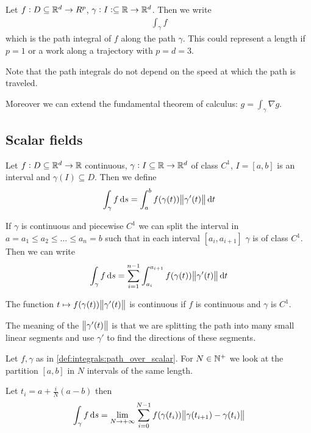 \documentclass[12pt]{extarticle}
\begin{document}
Let $f: D \subseteq \mathbb{R}^d \to R^p$, $\gamma: I:\subseteq \mathbb{R} \to \mathbb{R}^d$.
Then we write
\begin{eqnarray}
    \int_\gamma f
\end{eqnarray}
which is the path integral of $f$ along the path $\gamma$.
This could represent a length if $p = 1$ or a work along a trajectory with $p = d = 3$.

Note that the path integrals do not depend on the speed at which the path is traveled.

Moreover we can extend the fundamental theorem of calculus: $g = \int_\gamma \nabla g$.

\subsection{Scalar fields}

\begin{definition}
    \label{def:integrals:path_over_scalar}
    Let $f: D \subseteq \mathbb{R}^d \to \mathbb{R}$ continuous, $\gamma: I \subseteq \mathbb{R} \to \mathbb{R}^d$ of class $C^1$, $I = [a, b]$ is an interval and $\gamma(I) \subseteq D$.
    Then we define
    \begin{equation}
        \int_\gamma f \dd{s} = \int_a^b f(\gamma(t)) \norm{\gamma'(t)} \dd{t}
    \end{equation}

    If $\gamma$ is continuous and piecewise $C^1$ we can split the interval in $a = a_1 \leq a_2 \leq \dots \leq a_n = b$ such that in each interval $[a_i, a_{i+1}]$ $\gamma$ is of class $C^1$.
    Then we can write
    \begin{equation}
        \int_{\gamma} f \dd{s} = \sum^{n -1}_{i = 1} \int^{a_{i+1}}_{a_i} f(\gamma(t)) \norm{\gamma'(t)} \dd{t}
    \end{equation}
\end{definition}

\begin{remark}
    The function $t \mapsto f(\gamma(t)) \norm{\gamma'(t)}$ is continuous if $f$ is continuous and $\gamma$ is $C^1$.
\end{remark}

The meaning of the $\norm{\gamma'(t)}$ is that we are splitting the path into many small linear segments and use $\gamma'$ to find the directions of these segments.

\begin{proposition}
    Let $f, \gamma$ as in \autoref{def:integrals:path_over_scalar}.
    For $N \in \mathbb{N}^+$ we look at the partition $[a, b]$ in $N$ intervals of the same length.

    Let $t_i = a + \frac{i}{N}(a-b)$
    then
    \begin{equation}
        \int_\gamma f \dd{s} = \lim_{N \to +\infty} \sum_{i = 0}^{N-1} f(\gamma(t_i)) \norm{\gamma(t_{i+1}) - \gamma(t_i)}
    \end{equation}
\end{proposition}
\end{document}
